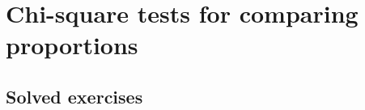 
\chapter{Chi-square tests for comparing proportions}\label{cha:chi-square-tests}

\section{Solved exercises}
\begin{enumerate}[leftmargin=*]





\end{enumerate}
